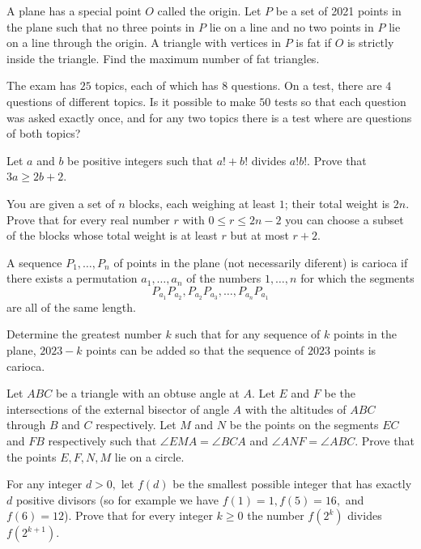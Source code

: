 \documentclass[11pt]{scrartcl}
\begin{document}
\begin{problem}[3600625270766782129]
A plane has a special point $O$ called the origin. Let $P$ be a set of 2021 points in the plane such that
no three points in $P$ lie on a line and
no two points in $P$ lie on a line through the origin.
A triangle with vertices in $P$ is fat if $O$ is strictly inside the triangle. Find the maximum number of fat triangles.
\end{problem}
\begin{problem}[5101270312905584526]
The exam has $25$ topics, each of which has $8$ questions. On a test, there are $4$ questions of different topics.
Is it possible to make $50$ tests so that each question was asked exactly once, and for any two topics there is a test where are questions of both topics?
\end{problem}
\begin{problem}[869040684570675]
	Let $a$ and $b$ be positive integers such that $a! + b!$ divides $a!b!$. Prove that $3a \ge 2b + 2$.
\end{problem}
\begin{problem}[37921131297270]
	You are given a set of $n$ blocks, each weighing at least $1$; their total weight is $2n$. Prove that for every real number $r$ with $0 \leq r \leq 2n-2$ you can choose a subset of the blocks whose total weight is at least $r$ but at most $r + 2$.
\end{problem}
\begin{problem}[3707562559770315754]
	A sequence $P_1, \dots, P_n$ of points in the plane (not necessarily diferent) is carioca if there exists a permutation $a_1, \dots, a_n$ of the numbers $1, \dots, n$ for which the segments
$$P_{a_1}P_{a_2}, P_{a_2}P_{a_3}, \dots, P_{a_n}P_{a_1}$$are all of the same length.

Determine the greatest number $k$ such that for any sequence of $k$ points in the plane, $2023-k$ points can be added so that the sequence of $2023$ points is carioca.
\end{problem}
\begin{problem}[453277275848272]
	Let $ABC$ be a triangle with an obtuse angle at $A$. Let $E$ and $F$ be the intersections of the external bisector of angle $A$ with the altitudes of $ABC$ through $B$ and $C$ respectively. Let $M$ and $N$ be the points on the segments $EC$ and $FB$ respectively such that $\angle EMA = \angle BCA$ and $\angle ANF = \angle ABC$. Prove that the points $E, F, N, M$ lie on a circle.
\end{problem}
\begin{problem}[8752098831819609857]
For any integer $d > 0,$ let $f(d)$ be the smallest possible integer that has exactly $d$ positive divisors (so for example we have $f(1)=1, f(5)=16,$ and $f(6)=12$). Prove that for every integer $k \geq 0$ the number $f\left(2^k\right)$ divides $f\left(2^{k+1}\right).$
\end{problem}
\end{document}
